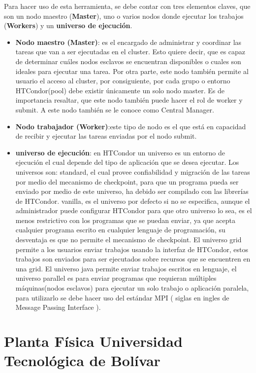 Para hacer uso de esta herramienta, se debe contar con tres elementos claves, que son un nodo maestro (\textbf{Master}), uno o varios nodos donde ejecutar los trabajos (\textbf{Workers}) y un \textbf{universo de ejecución}.

\begin{itemize}
\item \textbf{Nodo maestro (Master)}: es el encargado de administrar y coordinar las tareas que van a ser ejecutadas en el cluster. Esto quiere decir, que es capaz de determinar cuáles nodos esclavos se encuentran disponibles o cuales son ideales para ejecutar una tarea. Por otra parte, este nodo también permite al usuario el acceso al cluster, por consiguiente, por cada grupo o entorno HTCondor(pool) debe existir únicamente un solo nodo master. Es de importancia resaltar, que este nodo también puede hacer el rol de worker y submit. A este nodo también se le conoce como Central Manager.
\item \textbf{Nodo trabajador (Worker)}:este tipo de nodo es el que está en capacidad de recibir y ejecutar las tareas enviadas por el nodo submit.
\item \textbf{universo de ejecución}: en HTCondor un universo es un entorno de ejecución el cual depende del tipo de aplicación que se desea ejecutar. Los universos son: standard, el cual provee confiabilidad y migración de las tareas por medio del mecanismo de checkpoint, para que un programa pueda ser enviado por medio de este universo, ha debido ser compilado con las librerías de HTCondor. vanilla, es el universo por defecto si no se especifica, aunque el administrador puede configurar HTCondor para que otro universo lo sea, es el menos restrictivo con los programas que se puedan enviar, ya que acepta cualquier programa escrito en cualquier lenguaje de programación, su desventaja es que no permite el mecanismo de checkpoint. El universo grid permite a los usuarios enviar trabajos usando la interfaz de HTCondor, estos trabajos son enviados para ser ejecutados sobre recursos que se encuentren en una grid. El universo java permite enviar trabajos escritos en lenguaje, el universo parallel es para enviar programas que requieran múltiples máquinas(nodos esclavos) para ejecutar un solo trabajo o aplicación paralela, para utilizarlo se debe hacer uso del estándar MPI ( siglas en ingles de Message Passing Interface ).

\end{itemize}

\section{Planta Física Universidad Tecnológica de Bolívar}

